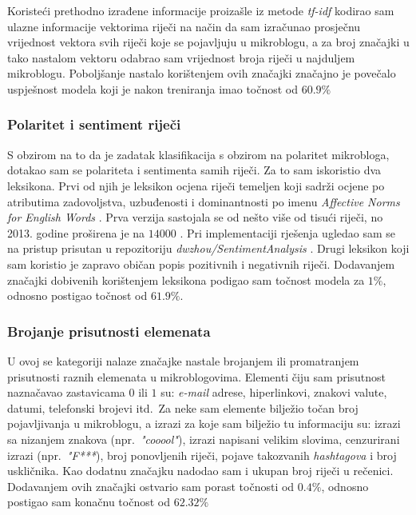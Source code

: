 \documentclass[times, utf8, zavrsni]{fer}
\begin{document}
Koristeći prethodno izrađene informacije proizašle iz metode \emph{tf-idf} kodirao sam ulazne informacije vektorima riječi na način da sam izračunao prosječnu vrijednost vektora svih riječi koje se pojavljuju u mikroblogu, a za broj značajki u tako nastalom vektoru odabrao sam vrijednost broja riječi u najduljem mikroblogu. Poboljšanje nastalo korištenjem ovih značajki značajno je povečalo uspješnost modela koji je nakon treniranja imao točnost od $60.9\%$

\subsubsection{Polaritet i sentiment riječi}

S obzirom na to da je zadatak klasifikacija s obzirom na polaritet mikrobloga, dotakao sam se polariteta i sentimenta samih riječi. Za to sam iskoristio dva leksikona. Prvi od njih je leksikon ocjena riječi temeljen koji sadrži ocjene po atributima zadovoljstva, uzbuđenosti i dominantnosti po imenu  \emph{Affective Norms for English Words} \citep{anew}. Prva verzija sastojala se od nešto više od tisući riječi, no 2013. godine proširena je na $14000$ \citep{anew2}. Pri implementaciji rješenja ugledao sam se na pristup prisutan u repozitoriju \emph{dwzhou/SentimentAnalysis} \citep{anew_code}. Drugi leksikon koji sam koristio je zapravo običan popis pozitivnih i negativnih riječi. %
\noindent Dodavanjem značajki dobivenih korištenjem leksikona podigao sam točnost modela za $1\%$, odnosno postigao točnost od $61.9\%$.

\subsubsection{Brojanje prisutnosti elemenata}

U ovoj se kategoriji nalaze značajke nastale brojanjem ili promatranjem prisutnosti raznih elemenata u mikroblogovima. Elementi čiju sam prisutnost naznačavao zastavicama $0$ ili $1$ su: \emph{e-mail} adrese, hiperlinkovi, znakovi valute, datumi, telefonski brojevi itd.~Za neke sam elemente bilježio točan broj pojavljivanja u mikroblogu, a izrazi za koje sam bilježio tu informaciju su: izrazi sa nizanjem znakova (npr.~\emph{"cooool"}), izrazi napisani velikim slovima, cenzurirani izrazi (npr.~\emph{"F***}), broj ponovljenih riječi, pojave takozvanih \emph{hashtagova} i broj uskličnika. Kao dodatnu značajku nadodao sam i ukupan broj riječi u rečenici.
\noindent Dodavanjem ovih značajki ostvario sam porast točnosti od $0.4\%$, odnosno postigao sam konačnu točnost od $62.32\%$
\end{document}
